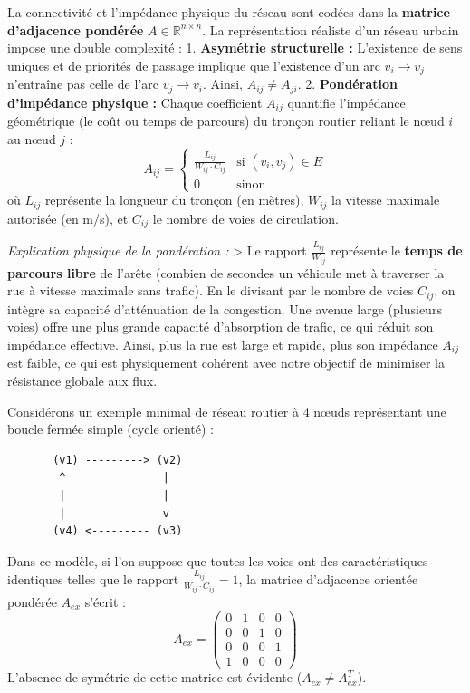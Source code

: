\documentclass[10pt, a4paper]{article}
\begin{document}
La connectivité et l'impédance physique du réseau sont codées dans la
\textbf{matrice d'adjacence pondérée} \(A \in \mathbb{R}^{n \times n}\).
La représentation réaliste d'un réseau urbain impose une double
complexité : 1. \textbf{Asymétrie structurelle :} L'existence de sens
uniques et de priorités de passage implique que l'existence d'un arc
\(v_i \to v_j\) n'entraîne pas celle de l'arc \(v_j \to v_i\). Ainsi,
\(A_{ij} \neq A_{ji}\). 2. \textbf{Pondération d'impédance physique :}
Chaque coefficient \(A_{ij}\) quantifie l'impédance géométrique (le coût
ou temps de parcours) du tronçon routier reliant le nœud \(i\) au nœud
\(j\) :
\[A_{ij} = \begin{cases} \frac{L_{ij}}{W_{ij} \cdot C_{ij}} & \text{si } (v_i, v_j) \in E \\ 0 & \text{sinon} \end{cases}\]
où \(L_{ij}\) représente la longueur du tronçon (en mètres), \(W_{ij}\)
la vitesse maximale autorisée (en m/s), et \(C_{ij}\) le nombre de voies
de circulation.

\emph{Explication physique de la pondération :} \textgreater{} Le
rapport \(\frac{L_{ij}}{W_{ij}}\) représente le \textbf{temps de
parcours libre} de l'arête (combien de secondes un véhicule met à
traverser la rue à vitesse maximale sans trafic). En le divisant par le
nombre de voies \(C_{ij}\), on intègre sa capacité d'atténuation de la
congestion. Une avenue large (plusieurs voies) offre une plus grande
capacité d'absorption de trafic, ce qui réduit son impédance effective.
Ainsi, plus la rue est large et rapide, plus son impédance \(A_{ij}\)
est faible, ce qui est physiquement cohérent avec notre objectif de
minimiser la résistance globale aux flux.

Considérons un exemple minimal de réseau routier à 4 nœuds représentant
une boucle fermée simple (cycle orienté) :

\begin{verbatim}
       (v1) ---------> (v2)
        ^               |
        |               |
        |               v
       (v4) <--------- (v3)
\end{verbatim}

Dans ce modèle, si l'on suppose que toutes les voies ont des
caractéristiques identiques telles que le rapport
\(\frac{L_{ij}}{W_{ij} \cdot C_{ij}} = 1\), la matrice d'adjacence
orientée pondérée \(A_{ex}\) s'écrit : \[A_{ex} = \begin{pmatrix}
0 & 1 & 0 & 0 \\
0 & 0 & 1 & 0 \\
0 & 0 & 0 & 1 \\
1 & 0 & 0 & 0
\end{pmatrix}\] L'absence de symétrie de cette matrice est évidente
(\(A_{ex} \neq A_{ex}^T\)).
\end{document}
